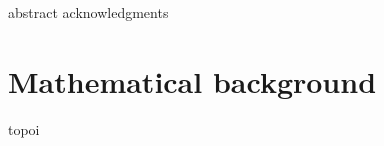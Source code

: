 \documentclass[a4paper,oneside]{memoir}
\begin{document}
\frontmatter
\thetitlepage
{abstract}
{acknowledgments}
\begin{KeepFromToc} %
  \tableofcontents
\end{KeepFromToc}

\mainmatter
\part{Mathematical background}
{topoi}

\appendix
\appendixpage

\backmatter
\printbibliography
\end{document}
